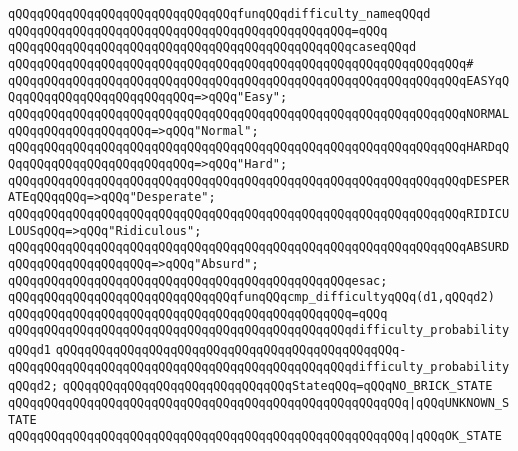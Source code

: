 \verb|qQQqqQQqqQQqqQQqqQQqqQQqqQQqqQQqfunqQQqdifficulty_nameqQQqd|\newline
\verb|qQQqqQQqqQQqqQQqqQQqqQQqqQQqqQQqqQQqqQQqqQQqqQQq=qQQq|\newline
\verb|qQQqqQQqqQQqqQQqqQQqqQQqqQQqqQQqqQQqqQQqqQQqqQQqcaseqQQqd|\newline
\verb|qQQqqQQqqQQqqQQqqQQqqQQqqQQqqQQqqQQqqQQqqQQqqQQqqQQqqQQqqQQqqQQq#|\newline
\verb|qQQqqQQqqQQqqQQqqQQqqQQqqQQqqQQqqQQqqQQqqQQqqQQqqQQqqQQqqQQqqQQqEASYqQQqqQQqqQQqqQQqqQQqqQQqqQQq=>qQQq"Easy";|\newline
\verb|qQQqqQQqqQQqqQQqqQQqqQQqqQQqqQQqqQQqqQQqqQQqqQQqqQQqqQQqqQQqqQQqNORMALqQQqqQQqqQQqqQQqqQQq=>qQQq"Normal";|\newline
\verb|qQQqqQQqqQQqqQQqqQQqqQQqqQQqqQQqqQQqqQQqqQQqqQQqqQQqqQQqqQQqqQQqHARDqQQqqQQqqQQqqQQqqQQqqQQqqQQq=>qQQq"Hard";|\newline
\verb|qQQqqQQqqQQqqQQqqQQqqQQqqQQqqQQqqQQqqQQqqQQqqQQqqQQqqQQqqQQqqQQqDESPERATEqQQqqQQq=>qQQq"Desperate";|\newline
\verb|qQQqqQQqqQQqqQQqqQQqqQQqqQQqqQQqqQQqqQQqqQQqqQQqqQQqqQQqqQQqqQQqRIDICULOUSqQQq=>qQQq"Ridiculous";|\newline
\verb|qQQqqQQqqQQqqQQqqQQqqQQqqQQqqQQqqQQqqQQqqQQqqQQqqQQqqQQqqQQqqQQqABSURDqQQqqQQqqQQqqQQqqQQq=>qQQq"Absurd";|\newline
\verb|qQQqqQQqqQQqqQQqqQQqqQQqqQQqqQQqqQQqqQQqqQQqqQQqesac;|\newline
\newline
\verb|qQQqqQQqqQQqqQQqqQQqqQQqqQQqqQQqfunqQQqcmp_difficultyqQQq(d1,qQQqd2)|\newline
\verb|qQQqqQQqqQQqqQQqqQQqqQQqqQQqqQQqqQQqqQQqqQQqqQQq=qQQq|\newline
\verb|qQQqqQQqqQQqqQQqqQQqqQQqqQQqqQQqqQQqqQQqqQQqqQQqdifficulty_probabilityqQQqd1|\newline
\verb|qQQqqQQqqQQqqQQqqQQqqQQqqQQqqQQqqQQqqQQqqQQqqQQq-|\newline
\verb|qQQqqQQqqQQqqQQqqQQqqQQqqQQqqQQqqQQqqQQqqQQqqQQqdifficulty_probabilityqQQqd2;|\newline
\newline
\verb|qQQqqQQqqQQqqQQqqQQqqQQqqQQqqQQqStateqQQq=qQQqNO_BRICK_STATE|\newline
\verb|qQQqqQQqqQQqqQQqqQQqqQQqqQQqqQQqqQQqqQQqqQQqqQQqqQQqqQQq|\verb#|qQQqUNKNOWN_STATE#\newline
\verb|qQQqqQQqqQQqqQQqqQQqqQQqqQQqqQQqqQQqqQQqqQQqqQQqqQQqqQQq|\verb#|qQQqOK_STATE#\newline
